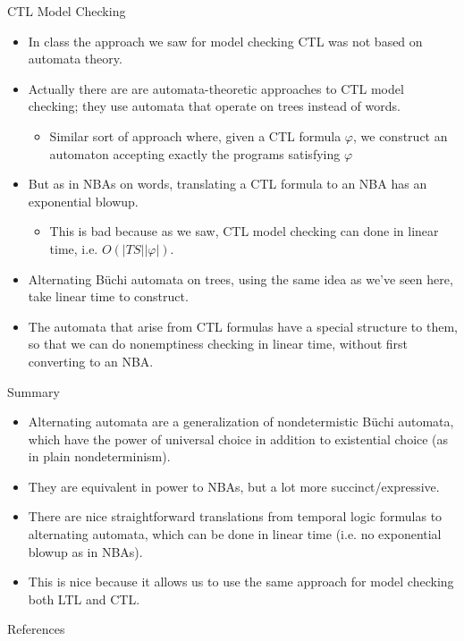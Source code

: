 \documentclass{beamer}
\begin{document}
\begin{frame}{CTL Model Checking}
\begin{itemize}
\item In class the approach we saw for model checking CTL was not based on
automata theory.
\pause
\item Actually there are are automata-theoretic approaches to CTL model
checking; they use automata that operate on trees instead of words. 
    \begin{itemize}
    \item Similar sort of approach where, given a CTL formula $\varphi$, we 
    construct an automaton accepting exactly the programs satisfying $\varphi$
    \end{itemize}
\pause
\item But as in NBAs on words, translating a CTL formula to an NBA has
an exponential blowup. 
    \begin{itemize}
    \item This is bad because as we saw, CTL model checking can done in linear time, i.e.  $O(|TS||\varphi|)$.  
    \end{itemize}
\pause
\item Alternating B\"{u}chi automata on trees, using the same idea as we've
seen here, take linear time to construct.
\pause
\item The automata that arise from CTL formulas have a special structure to
them, so that we can do nonemptiness checking in linear time, without
first converting to an NBA.
\end{itemize}
\end{frame}

\begin{frame}{Summary}
\begin{itemize}
\item Alternating automata are a generalization of nondetermistic B\"{u}chi
automata, which have the power of universal choice in addition to
existential choice (as in plain nondeterminism).
\item They are equivalent in power to NBAs, but a lot more succinct/expressive.
\item There are nice straightforward translations from temporal logic
formulas to alternating automata, which can be done in linear time (i.e.
no exponential blowup as in NBAs).
\item This is nice because it allows us to use the same approach for
model checking both LTL and CTL.
\end{itemize}
\end{frame}

\begin{frame}{References}

{\footnotesize
}
\end{frame}
\end{document}
